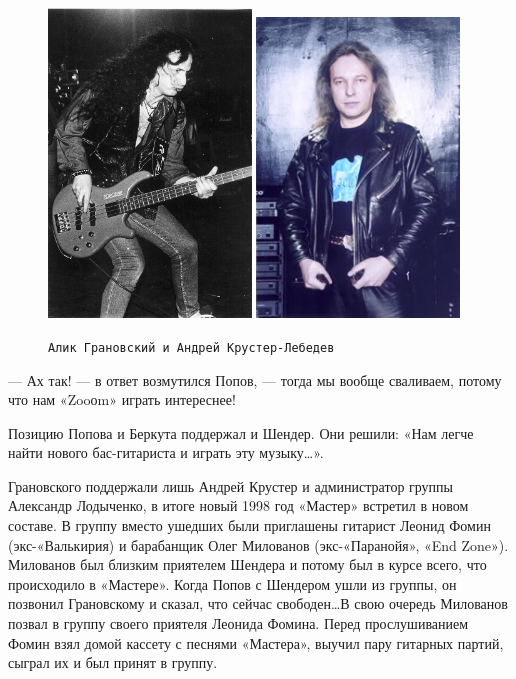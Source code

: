 \documentclass[10pt, twoside]{book}
\begin{document}
\begin{figure}[h]
    \centering
    \includegraphics[width=0.48\textwidth]{Image31}
    \hfill
    \includegraphics[width=0.48\textwidth]{Image32}
    \caption{\texttt{Алик Грановский и Андрей Крустер-Лебедев}}
\end{figure}

— Ах так! — в ответ возмутился Попов, — тогда мы вообще сваливаем, потому что нам «Zooоm» играть интереснее!

Позицию Попова и Беркута поддержал и Шендер. Они решили: «Нам легче найти нового бас-гитариста и играть эту
музыку\ldots».

Грановского поддержали лишь Андрей Крустер и администратор группы Александр Лодыченко, в итоге новый 1998 год «Мастер»
встретил в новом составе. В группу вместо ушедших были приглашены гитарист Леонид Фомин (экс-«Валькирия) и барабанщик
Олег Милованов (экс-«Паранойя», «End Zone»). Милованов был близким приятелем Шендера и потому был в курсе всего, что
происходило в «Мастере». Когда Попов с Шендером ушли из группы, он позвонил Грановскому и сказал, что сейчас
свободен\ldots В свою очередь Милованов позвал в группу своего приятеля Леонида Фомина. Перед прослушиванием Фомин взял
домой кассету с песнями «Мастера», выучил пару гитарных партий, сыграл их и был принят в группу.
\end{document}
